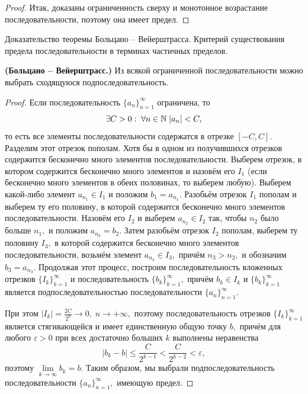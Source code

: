 \begin{proof}
    Итак, доказаны ограниченность сверху и монотонное
    возрастание последовательности, поэтому она имеет
    предел.
\end{proof}

\newpage
\begin{problem}
Доказательство теоремы Больцано – Вейерштрасса. Критерий существования предела последовательности в терминах частичных пределов.
\end{problem}

\begin{theorem}\textbf{(Больцано -- Вейерштрасс.)}
    Из всякой ограниченной последовательности
    можно выбрать сходящуюся подпоследовательность.
\end{theorem}
\begin{proof}
    Если последовательность $\{a_n\}_{n=1}^{\infty}$
    ограничена, то
    $$
        \exists C>0:\;\forall n\in\mathbb{N}\;|a_n|<C,
    $$
    то есть все элементы последовательности
    содержатся в отрезке $[-C, C].$
    Разделим этот отрезок пополам.
    Хотя бы в одном из получившихся отрезков
    содержится бесконечно много
    элементов последовательности. Выберем
    отрезок, в котором содержится бесконечно
    много элементов и назовём его $I_1$
    (если бесконечно много элементов в обеих
    половинах, то выберем любую).
    Выберем какой-либо элемент $a_{n_1}\in I_1$
    и положим $b_1=a_{n_1}.$ Разобьём отрезок
    $I_1$ пополам и выберем ту его половину,
    в которой содержится бесконечно много
    элементов последовательности. Назовём
    его $I_2$ и выберем $a_{n_2}\in I_2$ так,
    чтобы $n_2$ было больше $n_1,$ и положим
    $a_{n_2}=b_2.$ Затем разобьём отрезок $I_2$
    пополам, выберем ту половину $I_3,$ в которой
    содержится бесконечно много элементов
    последовательности, возьмём элемент
    $a_{n_3}\in I_3,$ причём $n_3>n_2,$
    и обозначим $b_3=a_{n_3}.$ Продолжая этот
    процесс, построим последовательность
    вложенных отрезков $\{I_k\}_{k=1}^{\infty}$
    и последовательность $\{b_k\}_{k=1}^{\infty},$
    причём $b_k\in I_k$ и $\{b_k\}_{k=1}^{\infty}$
    является подпоследовательностью последовательности
    $\{a_n\}_{n=1}^{\infty}.$

    При этом $|I_k|=\frac{2C}{2^k}\rightarrow0,\;n
        \rightarrow+\infty,$ поэтому последовательность
    отрезков $\{I_k\}_{k=1}^{\infty}$ является
    стягивающейся и имеет единственную
    общую точку $b,$ причём для любого
    $\varepsilon>0$ при всех достаточно
    больших $k$ выполнены неравенства
    $$
        |b_k-b|\leq\frac{C}{2^{k-1}}<\frac{C}{2^{k-2}}
        <\varepsilon,
    $$
    поэтому $\lim\limits_{k\rightarrow\infty}
        b_{k}=b.$
    Таким образом, мы выбрали подпоследовательность
    последовательности $\{a_n\}_{n=1}^{\infty},$
    имеющую предел.
\end{proof}

